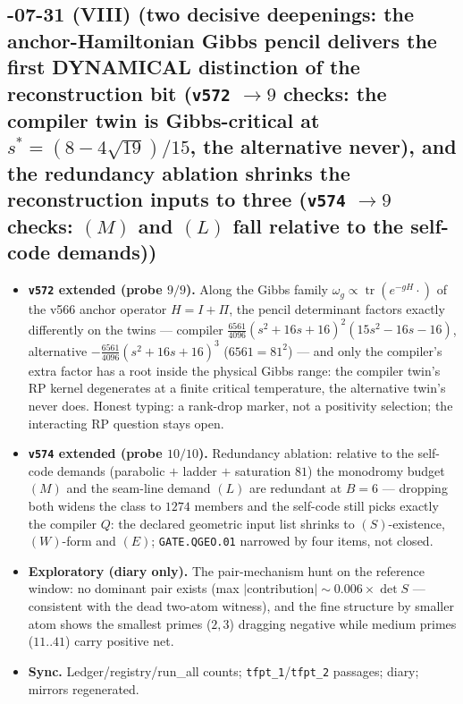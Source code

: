 \subsection*{-07-31 (VIII) (two decisive deepenings: the anchor-Hamiltonian Gibbs pencil delivers the first DYNAMICAL distinction of the reconstruction bit (\texttt{v572} $\to9$ checks: the compiler twin is Gibbs-critical at $s^*=(8-4\sqrt{19})/15$, the alternative never), and the redundancy ablation shrinks the reconstruction inputs to three (\texttt{v574} $\to9$ checks: $(M)$ and $(L)$ fall relative to the self-code demands))}
\begin{itemize}[leftmargin=1.5em]
\item \textbf{\texttt{v572} extended (probe $9/9$).} Along the Gibbs family
$\omega_g\propto\operatorname{tr}(e^{-gH}\cdot)$ of the v566 anchor operator $H=I+\Pi$, the
pencil determinant factors exactly differently on the twins --- compiler
$\tfrac{6561}{4096}(s^2{+}16s{+}16)^2(15s^2{-}16s{-}16)$, alternative
$-\tfrac{6561}{4096}(s^2{+}16s{+}16)^3$ ($6561=81^2$) --- and only the compiler's extra factor
has a root inside the physical Gibbs range: the compiler twin's RP kernel degenerates at a
finite critical temperature, the alternative twin's never does.  Honest typing: a rank-drop
marker, not a positivity selection; the interacting RP question stays open.
\item \textbf{\texttt{v574} extended (probe $10/10$).} Redundancy ablation: relative to the
self-code demands (parabolic $+$ ladder $+$ saturation $81$) the monodromy budget $(M)$ and the
seam-line demand $(L)$ are redundant at $B=6$ --- dropping both widens the class to $1274$
members and the self-code still picks exactly the compiler $Q$: the declared geometric input
list shrinks to $(S)$-existence, $(W)$-form and $(E)$; \texttt{GATE.QGEO.01} narrowed by four
items, not closed.
\item \textbf{Exploratory (diary only).} The pair-mechanism hunt on the reference window: no
dominant pair exists (max $|$contribution$|\sim0.006\times\det S$ --- consistent with the dead
two-atom witness), and the fine structure by smaller atom shows the smallest primes ($2,3$)
dragging negative while medium primes ($11..41$) carry positive net.
\item \textbf{Sync.} Ledger/registry/run\_all counts; \texttt{tfpt\_1}/\texttt{tfpt\_2}
passages; diary; mirrors regenerated.
\end{itemize}

